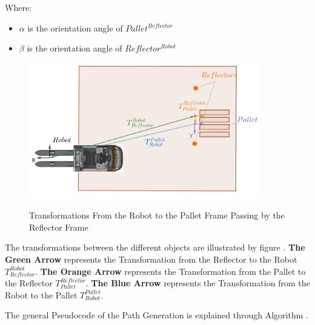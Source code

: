 Where:
\begin{itemize}
    \item \( \alpha \) is the orientation angle of $Pallet^{Reflector}$
    \item \( \beta \) is the orientation angle of $Reflector^{Robot}$
\end{itemize}



\begin{figure}[H]
    \begin{center}
        \includegraphics[width=4in]{images/Chap2/Transformation.png}\\
        \caption{Transformations From the Robot to the Pallet Frame Passing by the Reflector
        Frame}
        \label{Transformation}
        \end{center}    
\end{figure}
The transformations between the different objects are illustrated by figure .
\textbf{The Green Arrow} represents the Transformation from the Reflector to the Robot $T_{Reflector}^{Robot}$.
\textbf{The Orange Arrow} represents the Transformation from the Pallet to the Reflector $T_{Pallet}^{Reflector}$.
\textbf{The Blue Arrow} represents the Transformation from the Robot to the Pallet $T_{Robot}^{Pallet}$.

The general Pseudocode of the Path Generation is explained through Algorithm .

